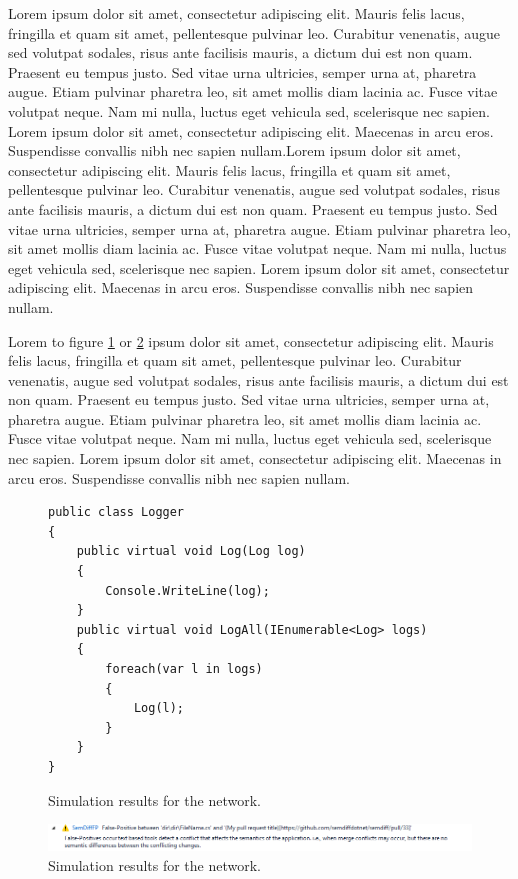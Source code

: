 \documentclass[draftclsnofoot,onecolumn]{IEEEtran}
\begin{document}
Lorem ipsum dolor sit amet, consectetur adipiscing elit. Mauris felis lacus, fringilla et quam sit amet, pellentesque pulvinar leo. Curabitur venenatis, augue sed volutpat sodales, risus ante facilisis mauris, a dictum dui est non quam. Praesent eu tempus justo. Sed vitae urna ultricies, semper urna at, pharetra augue. Etiam pulvinar pharetra leo, sit amet mollis diam lacinia ac. Fusce vitae volutpat neque. Nam mi nulla, luctus eget vehicula sed, scelerisque nec sapien. Lorem ipsum dolor sit amet, consectetur adipiscing elit. Maecenas in arcu eros. Suspendisse convallis nibh nec sapien nullam.Lorem ipsum dolor sit amet, consectetur adipiscing elit. Mauris felis lacus, fringilla et quam sit amet, pellentesque pulvinar leo. Curabitur venenatis, augue sed volutpat sodales, risus ante facilisis mauris, a dictum dui est non quam. Praesent eu tempus justo. Sed vitae urna ultricies, semper urna at, pharetra augue. Etiam pulvinar pharetra leo, sit amet mollis diam lacinia ac. Fusce vitae volutpat neque. Nam mi nulla, luctus eget vehicula sed, scelerisque nec sapien. Lorem ipsum dolor sit amet, consectetur adipiscing elit. Maecenas in arcu eros. Suspendisse convallis nibh nec sapien nullam.

Lorem to figure \ref{fig_sim1} or \ref{fig_sim2} ipsum dolor sit amet, consectetur adipiscing elit. Mauris felis lacus, fringilla et quam sit amet, pellentesque pulvinar leo. Curabitur venenatis, augue sed volutpat sodales, risus ante facilisis mauris, a dictum dui est non quam. Praesent eu tempus justo. Sed vitae urna ultricies, semper urna at, pharetra augue. Etiam pulvinar pharetra leo, sit amet mollis diam lacinia ac. Fusce vitae volutpat neque. Nam mi nulla, luctus eget vehicula sed, scelerisque nec sapien. Lorem ipsum dolor sit amet, consectetur adipiscing elit. Maecenas in arcu eros. Suspendisse convallis nibh nec sapien nullam.

\begin{figure}[!t]
\centering
\begin{lstlisting}
public class Logger
{
	public virtual void Log(Log log)
	{
		Console.WriteLine(log);
	}
	public virtual void LogAll(IEnumerable<Log> logs)
	{
		foreach(var l in logs)
		{
			Log(l);
		}
	}
}
\end{lstlisting}
\caption{Simulation results for the network.}
\label{fig_sim1}
\end{figure}


\begin{figure}[!t]
\centering
\includegraphics[width=\linewidth]{falsePositiveWarning}
\caption{Simulation results for the network.}
\label{fig_sim2}
\end{figure}
\end{document}
